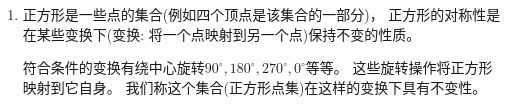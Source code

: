 \begin{enumerate}
	\item 正方形是一些点的集合(例如四个顶点是该集合的一部分)， 正方形的对称性是在某些变换下(变换: 将一个点映射到另一个点)保持不变的性质。
		
	符合条件的变换有绕中心旋转$90^\circ, 180^\circ, 270^\circ, 0^\circ$等等。 这些旋转操作将正方形映射到它自身。 我们称这个集合(正方形点集)在这样的变换下具有不变性。
	
	
	

\end{enumerate}
